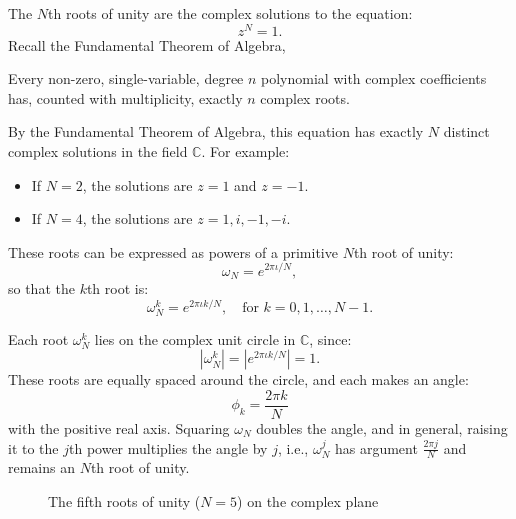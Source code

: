 \begin{definition}
The $N$th roots of unity are the complex solutions to the equation:
\begin{equation}
    z^N = 1.
    \label{eq:root_unity_equation}
\end{equation}
Recall the Fundamental Theorem of Algebra, 
\begin{lemma}
    Every non-zero, single-variable, degree $n$ polynomial with complex coefficients has, counted with multiplicity, exactly $n$ complex roots.
\end{lemma}
By the Fundamental Theorem of Algebra, this equation has exactly $N$ distinct complex solutions in the field $\mathbb{C}$. For example:
\begin{itemize}
    \item If $N = 2$, the solutions are $z = 1$ and $z = -1$.
    \item If $N = 4$, the solutions are $z = 1, i, -1, -i$.
\end{itemize}
These roots can be expressed as powers of a primitive $N$th root of unity:
\begin{equation}
    \omega_N = e^{2\pi\iota / N},
\end{equation}
so that the $k$th root is:
\begin{equation}
    \omega_N^k = e^{2\pi\iota k / N}, \quad \text{for } k = 0, 1, \dots, N-1.
    \label{eq:omega_powers}
\end{equation}
\end{definition}

\noindent
Each root $\omega_N^k$ lies on the complex unit circle in $\mathbb{C}$, since:
\[
|\omega_N^k| = \left| e^{2\pi\iota k / N} \right| = 1.
\]
These roots are equally spaced around the circle, and each makes an angle:
\[
\phi_k = \frac{2\pi k}{N}
\]
with the positive real axis. Squaring $\omega_N$ doubles the angle, and in general, raising it to the $j$th power multiplies the angle by $j$, i.e., $\omega_N^j$ has argument $\frac{2\pi j}{N}$ and remains an $N$th root of unity.

\begin{figure}[H]
    \centering
    \caption{The fifth roots of unity ($N = 5$) on the complex plane}
    \label{fig:rootsofunity}
\end{figure}

